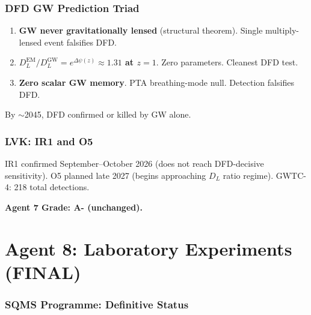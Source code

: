 \documentclass[11pt,a4paper]{article}
\begin{document}
\section{DFD GW Prediction Triad}

\begin{enumerate}
\item \textbf{GW never gravitationally lensed} (structural theorem). Single multiply-lensed event falsifies DFD.
\item \textbf{$D_L^\text{EM} / D_L^\text{GW} = e^{\Delta\psi(z)} \approx 1.31$ at $z = 1$}. Zero parameters. Cleanest DFD test.
\item \textbf{Zero scalar GW memory}. PTA breathing-mode null. Detection falsifies DFD.
\end{enumerate}

By $\sim$2045, DFD confirmed or killed by GW alone.

\section{LVK: IR1 and O5}

IR1 confirmed September--October 2026 (does not reach DFD-decisive sensitivity). O5 planned late 2027 (begins approaching $D_L$ ratio regime). GWTC-4: 218 total detections.

\textbf{Agent 7 Grade: A- (unchanged).}


\part{Agent 8: Laboratory Experiments (FINAL)}
\label{part:agent8}

\section{SQMS Programme: Definitive Status}
\end{document}
